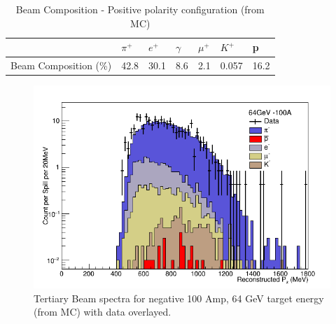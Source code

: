 \begin{table}[ht!]
\centering
\begin{tabular}{|l|l|l|l|l|l|l|}
\hline
                   & $\pi^+$ & $e^+$ & $\gamma$ & $\mu^+$ & $K^+$ & p \\ \hline
Beam Composition (\%) &    42.8     &  30.1     &    8.6      &    2.1     &    0.057    &    16.2            \\ \hline
\end{tabular}
\caption{Beam Composition - Positive polarity configuration (from MC)}
\label{tab:beamcomp2}
\end{table}



\begin{figure}[htb]
\begin{center}
\includegraphics[scale=0.35]{./images/BeamSpectrumExample.png}
\end{center}
\caption{Tertiary Beam spectra for negative 100 Amp, 64 GeV target energy (from MC) with data overlayed.}
\label{fig:beamspectrum}
\end{figure}
